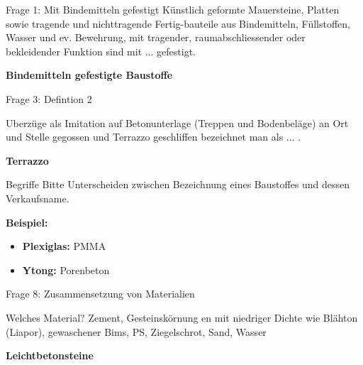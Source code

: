 \begin{frame}{Frage 1: Mit Bindemitteln gefestigt}
    Künstlich geformte Mauersteine, Platten sowie tragende und nichttragende Fertig-bauteile aus Bindemitteln,
Füllstoffen, Wasser und ev. Bewehrung, mit tragender, raumabschliessender oder bekleidender
Funktion sind mit ... gefestigt.

\pause
    \vspace{\baselineskip} 

    \textbf{Bindemitteln gefestigte Baustoffe}

    
\end{frame}

\begin{frame}{Frage 3: Defintion 2}

    Uberzüge als Imitation auf Betonunterlage (Treppen und Bodenbeläge) an Ort und Stelle gegossen und
Terrazzo
geschliffen bezeichnet man als ... .

\pause
    \vspace{\baselineskip} 

    \textbf{Terrazzo}
\end{frame}

\begin{frame}
    \begin{block}{Begriffe}
        Bitte Unterscheiden zwischen Bezeichnung eines Baustoffes und dessen Verkaufsname.
    
        \vspace{\baselineskip}
    
        \textbf{Beispiel:}
        \begin{itemize}
            \item \textbf{Plexiglas:} PMMA
            \item \textbf{Ytong:} Porenbeton
        \end{itemize}
    \end{block}
\end{frame}

\begin{frame}{Frage 8: Zusammensetzung von Materialien}
    
    \begin{block}{Welches Material?}
        Zement,
Gesteinskörnung
en mit niedriger
Dichte wie
Blähton (Liapor),
gewaschener
Bims, PS,
Ziegelschrot,
Sand, Wasser
    \end{block}

\pause
    \vspace{\baselineskip} 

    \textbf{Leichtbetonsteine}

\end{frame}


